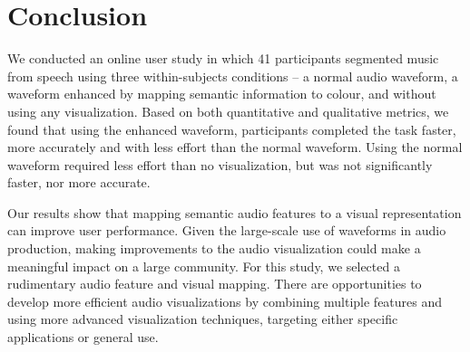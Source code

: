 \section{Conclusion}\label{sec:vis-conclusions}

We conducted an online user study in which 41 participants segmented music from speech using three within-subjects
conditions -- a normal audio waveform, a waveform enhanced by mapping semantic information to colour, and without using
any visualization.  Based on both quantitative and qualitative metrics, we found that using the enhanced waveform,
participants completed the task faster, more accurately and with less effort than the normal waveform. Using the normal
waveform required less effort than no visualization, but was not significantly faster, nor more accurate.

Our results show that mapping semantic audio features to a visual representation can improve user performance.  Given
the large-scale use of waveforms in audio production, making improvements to the audio visualization could make a
meaningful impact on a large community.  For this study, we selected a rudimentary audio feature and visual mapping.
There are opportunities to develop more efficient audio visualizations by combining multiple features and using more
advanced visualization techniques, targeting either specific applications or general use.



